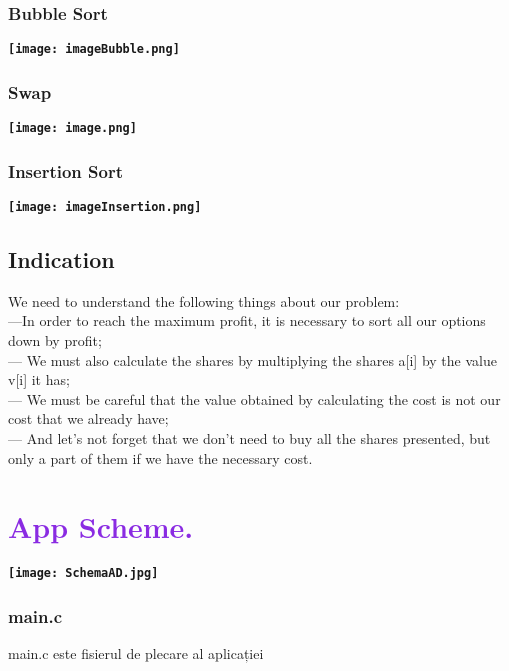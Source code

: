 \documentclass{article}
\begin{document}
\subsubsection{\textcolor{Periwinkle}{Bubble Sort}}
\begin{center}
    \textbf{\texttt{[image: imageBubble.png]}}
\end{center}
\subsubsection{\textcolor{Periwinkle}{Swap}}
\begin{center}
    \textbf{\texttt{[image: image.png]}}
\end{center}

\subsubsection{\textcolor{Periwinkle}{Insertion Sort}}
\begin{center}
    \textbf{\texttt{[image: imageInsertion.png]}}
\end{center}

\subsection{\textcolor{Periwinkle}{Indication}}
We need to understand the following things about our problem:\\
---In order to reach the maximum profit, it is necessary to sort all our options down by profit;\\
--- We must also calculate the shares by multiplying the shares a[i] by the value v[i] it has;\\
--- We must be careful that the value obtained by calculating the cost is not our cost that we already have;\\
--- And let’s not forget that we don’t need to buy all the shares presented, but only a part of them if we have the necessary cost.\\

\section{\textcolor{BlueViolet}{App Scheme.}}\label{sec_tr}
  \begin{center}
    \textbf{\texttt{[image: SchemaAD.jpg]}}
\end{center}
\subsubsection{\textcolor{Periwinkle}{main.c}}
\textcolor{Mulberry}{main.c} este  fisierul de plecare al aplicației 
\end{document}
